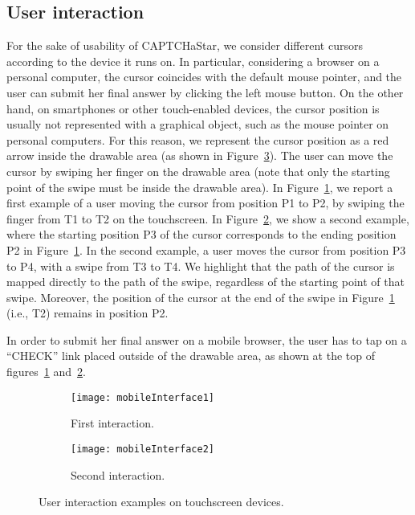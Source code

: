 \documentclass[conference]{IEEEtran}
\begin{document}
\subsection{User interaction}
\label{user_interaction}
For the sake of usability of CAPTCHaStar, we consider different cursors according to the device it runs on. 
In particular, considering a browser on a personal computer, the cursor coincides with the default mouse pointer, and the user can submit her final answer by clicking the left mouse button. 
On the other hand, on smartphones or other touch-enabled devices, the cursor position is usually not represented with a graphical object, such as the mouse pointer on personal computers.
For this reason, we represent the cursor position as a red arrow inside the drawable area (as shown in Figure~\ref{fig:mobileInterface}).
The user can move the cursor by swiping her finger on the drawable area (note that only the starting point of the swipe must be inside the drawable area). 
In Figure~\ref{fig:mobileInterface1}, we report a first example of a user moving the cursor from position P1 to P2, by swiping the finger from T1 to T2 on the touchscreen. 
In Figure~\ref{fig:mobileInterface2}, we show a second example, where the starting position P3 of the cursor corresponds to the ending position P2 in Figure~\ref{fig:mobileInterface1}. In the second example, a user moves the cursor from position P3 to P4, with a swipe from T3 to T4. 
We highlight that the path of the cursor is mapped directly to the path of the swipe, regardless of the starting point of that swipe.
Moreover, the position of the cursor at the end of the swipe in Figure~\ref{fig:mobileInterface1} (i.e., T2) remains in position P2. 

In order to submit her final answer on a mobile browser, the user has to tap on a ``CHECK'' link placed outside of the drawable area, as shown at the top of figures~\ref{fig:mobileInterface1} and~\ref{fig:mobileInterface2}.
\begin{figure}[h!]
\centering
\begin{subfigure}{.22\textwidth}
\centering
\texttt{[image: mobileInterface1]}
\caption{First interaction.}
\label{fig:mobileInterface1}
\end{subfigure}
\begin{subfigure}{.22\textwidth}
\centering
\texttt{[image: mobileInterface2]}
\caption{Second interaction.}
\label{fig:mobileInterface2}
\end{subfigure}
\vspace{-0.25cm}
\caption{User interaction examples on touchscreen devices.}
\label{fig:mobileInterface}
\end{figure}
\end{document}
